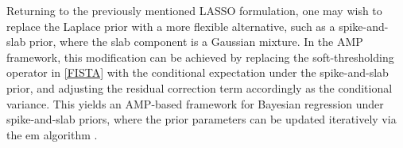 Returning to the previously mentioned LASSO formulation, one may wish to replace the Laplace prior with a more flexible alternative, such as a spike-and-slab prior, where the slab component is a Gaussian mixture. In the AMP framework, this modification can be achieved by replacing the soft-thresholding operator in \eqref{FISTA} with the conditional expectation under the spike-and-slab prior, and adjusting the residual correction term accordingly as the conditional variance. This yields an AMP-based framework for Bayesian regression under spike-and-slab priors, where the prior parameters can be updated iteratively via the \gls{em} algorithm \cite{EMGAMP2012}. 

